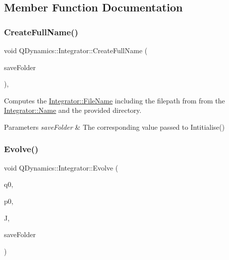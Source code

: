 \subsection{Member Function Documentation}
\mbox{\label{classQDynamics_1_1Integrator_ae80ab509b96a9b996934d9ef127f5137}} 
\subsubsection{\texorpdfstring{Create\+Full\+Name()}{CreateFullName()}}
{\footnotesize\ttfamily void Q\+Dynamics\+::\+Integrator\+::\+Create\+Full\+Name (\begin{DoxyParamCaption}\item[{std\+::string}]{save\+Folder }\end{DoxyParamCaption})\hspace{0.3cm}{\ttfamily [inline]}, {\ttfamily [private]}}



Computes the \hyperlink{classQDynamics_1_1Integrator_a19ed0b9864ebe762914cee04cb0ad4b3}{Integrator\+::\+File\+Name} including the filepath from from the \hyperlink{classQDynamics_1_1Integrator_aa3e27d68428619ab4083b2d42ef8924c}{Integrator\+::\+Name} and the provided directory. 


\begin{DoxyParams}{Parameters}
{\em save\+Folder} & The corresponding value passed to Intitialise() \\
\hline
\end{DoxyParams}
\mbox{\label{classQDynamics_1_1Integrator_a4b921b312775194b77c2c85f93add84e}} 
\subsubsection{\texorpdfstring{Evolve()}{Evolve()}}
{\footnotesize\ttfamily void Q\+Dynamics\+::\+Integrator\+::\+Evolve (\begin{DoxyParamCaption}\item[{\hyperlink{classQDynamics_1_1Quaternion}{Quaternion}}]{q0,  }\item[{\hyperlink{classQDynamics_1_1Quaternion}{Quaternion}}]{p0,  }\item[{\hyperlink{classJSL_1_1Vector}{J\+S\+L\+::\+Vector}}]{J,  }\item[{std\+::string}]{save\+Folder }\end{DoxyParamCaption})\hspace{0.3cm}{\ttfamily [inline]}}

